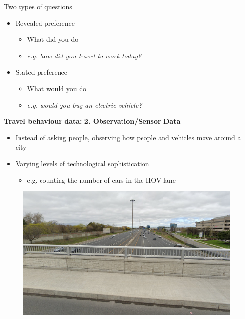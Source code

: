 \documentclass[aspectratio=169]{beamer}
\begin{document}
\begin{frame}

Two types of questions

\vspace{2mm}

	\begin{itemize}
		
		\item Revealed preference
		\begin{itemize}
			\item What did you do
			\item \textit{e.g. how did you travel to work today?}
		\end{itemize}
		
		\item Stated preference
		\begin{itemize}
			\item What would you do
			\item \textit{e.g. would you buy an electric vehicle?}
		\end{itemize}
		
	\end{itemize}
	
\end{frame}












\begin{frame}
	
	\textbf{Travel behaviour data: 2. Observation/Sensor Data}
	
	\begin{itemize}
		\item Instead of asking people, observing how people and vehicles move around a city
		\item Varying levels of technological sophistication
		
		\begin{itemize}
			\item e.g. counting the number of cars in the HOV lane
		\end{itemize}
		
	\end{itemize}
	
	\begin{figure}
		\centering
		\includegraphics[width=0.7\linewidth]{images/404_bridge.png}
	\end{figure}
	 
\end{frame}
\end{document}
